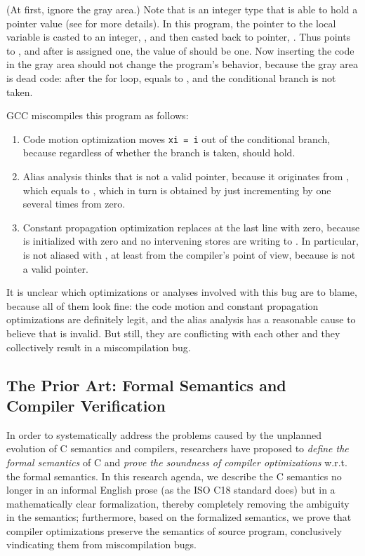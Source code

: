 \noindent (At first, ignore the gray area.)  Note that  is an integer type that is
able to hold a pointer value (see  for more details).  In this program, the
pointer to the local variable  is casted to an integer, , and then casted back to
pointer, .  Thus  points to , and after  is assigned one, the value
of  should be one.  Now inserting the code in the gray area should not change the program's
behavior, because the gray area is dead code: after the for loop,  equals to , and
the conditional branch is not taken.

GCC miscompiles this program as follows:
%
\begin{enumerate}
\item Code motion optimization moves \texttt{xi = i} out of the conditional branch, because
  regardless of whether the branch is taken,  should hold.
\item Alias analysis thinks that  is not a valid pointer, because it originates from
  , which equals to , which in turn is obtained by just incrementing by one several
  times from zero.
\item Constant propagation optimization replaces  at the last line with zero, because
   is initialized with zero and no intervening stores are writing to .  In
  particular,  is not aliased with , at least from the compiler's point of view,
  because  is not a valid pointer.
\end{enumerate}

\noindent It is unclear which optimizations or analyses involved with this bug are to blame, because
all of them look fine: the code motion and constant propagation optimizations are definitely legit,
and the alias analysis has a reasonable cause to believe that  is invalid.  But still, they
are conflicting with each other and they collectively result in a miscompilation bug.


\subsection{The Prior Art: Formal Semantics and Compiler Verification}

In order to systematically address the problems caused by the unplanned evolution of C semantics and
compilers, researchers have proposed to \emph{define the formal semantics} of C and \emph{prove the
  soundness of compiler optimizations} w.r.t. the formal semantics.  In this research agenda, we
describe the C semantics no longer in an informal English prose (as the ISO C18 standard does) but
in a mathematically clear formalization, thereby completely removing the ambiguity in the semantics;
furthermore, based on the formalized semantics, we prove that compiler optimizations preserve the
semantics of source program, conclusively vindicating them from miscompilation bugs.

